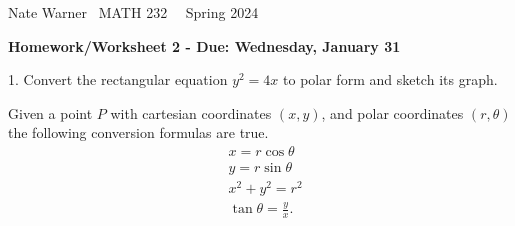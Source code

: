 \documentclass{report}
\title{\Huge{}}
\author{\huge{Nathan Warner}}
\date{\huge{}}
\begin{document}
    \pagebreak \bigbreak \noindent
    Nate Warner \ \quad \quad \quad \quad \quad \quad \quad \quad \quad \quad \quad \quad  MATH 232 \quad  \quad \quad \quad \quad \quad \quad \quad \quad \ \ \quad \quad Spring 2024
    \begin{center}
        \textbf{Homework/Worksheet 2 - Due: Wednesday, January 31}
    \end{center}
    \bigbreak \noindent 
    \begin{mdframed}
        1. Convert the rectangular equation $y^{2} = 4x$ to polar form and sketch its graph.
    \end{mdframed}
    \bigbreak \noindent 
    \begin{remark}
        Given a point $P$ with cartesian coordinates $(x,y)$, and polar coordinates $(r, \theta)$ the following conversion formulas are true.
       \begin{align*}
           &x = r\cos{\theta} \\
           &y= r\sin{\theta} \\
           &x^{2} +y^{2} = r^{2} \\
           &\tan{\theta} = \frac{y}{x}
       .\end{align*} 
    \end{remark}
    \bigbreak \noindent 
\end{document}
